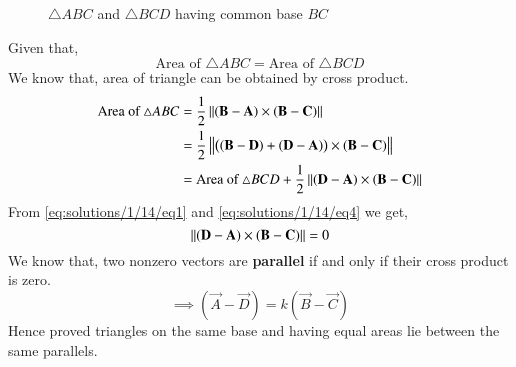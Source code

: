 \begin{figure}[!ht]
    \centering
    \resizebox{\columnwidth}{!}{}
    \caption{$\triangle{ABC}$ and $\triangle{BCD}$ having common base $BC$}
    \label{eq:solutions/1/14/fig:solutions/1/14/triangle}
\end{figure}
Given that, 
\begin{equation}
    \label{eq:solutions/1/14/eq1}\text{Area of }\triangle{ABC} = \text{Area of }\triangle{BCD}
\end{equation}
We know that, area of triangle can be obtained by cross product.
{\small
\begin{align}
    \text{Area of }\triangle{ABC} 
    \label{eq:solutions/1/14/eq2}&= \frac{1}{2} \left\lVert(\mathbf{B}-\mathbf{A}) \times (\mathbf{B}-\mathbf{C})\right\rVert\\
    \label{eq:solutions/1/14/eq3}&= \frac{1}{2} \left\lVert\big((\mathbf{B}-\mathbf{D})+(\mathbf{D}-\mathbf{A})\big) \times (\mathbf{B}-\mathbf{C})\right\rVert\\
    \label{eq:solutions/1/14/eq4}&= \text{Area of }\triangle{BCD} + \frac{1}{2} \left\lVert(\mathbf{D}-\mathbf{A}) \times (\mathbf{B}-\mathbf{C})\right\rVert
\end{align}
}
From \eqref{eq:solutions/1/14/eq1} and \eqref{eq:solutions/1/14/eq4} we get,
\begin{equation}
    \label{eq:solutions/1/14/eq5}\left\lVert(\mathbf{D}-\mathbf{A}) \times (\mathbf{B}-\mathbf{C})\right\rVert = 0
\end{equation}
We know that, two nonzero vectors are \textbf{parallel} if and only if their cross product is zero.
\begin{equation}
    \label{eq:solutions/1/14/eq6}\implies (\vec{A}-\vec{D}) = k(\vec{B}-\vec{C})
\end{equation}
Hence proved triangles on the same base and having equal areas lie between the same parallels.
